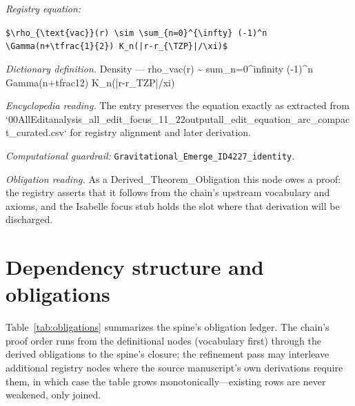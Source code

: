 \documentclass[11pt]{article}
\theoremstyle{remark}
\begin{document}
\noindent\textit{Registry equation:}\par
{\small\texttt{\$\textbackslash{}rho\_\{\textbackslash{}text\{vac\}\}(r) \textbackslash{}sim \textbackslash{}sum\_\{n=0\}\textasciicircum{}\{\textbackslash{}infty\} (-1)\textasciicircum{}n \textbackslash{}Gamma(n+\textbackslash{}tfrac\{1\}\{2\}) K\_n(|r-r\_\{\textbackslash{}TZP\}|/\textbackslash{}xi)\$}}\par\medskip
\noindent\textit{Dictionary definition.} Density --- rho\_vac(r) \textasciitilde{} sum\_n=0\textasciicircum{}infinity (-1)\textasciicircum{}n Gamma(n+tfrac12) K\_n(|r-r\_TZP|/xi)\par\medskip
\noindent\textit{Encyclopedia reading.} The entry preserves the equation exactly as extracted from `00AllEditanalysis\_all\_edit\_focus\_11\_22outputall\_edit\_equation\_arc\_compact\_curated.csv` for registry alignment and later derivation.
\par\medskip\noindent\textit{Computational guardrail:} \texttt{Gravitational\_Emerge\_ID4227\_identity}.
\par\medskip\noindent\textit{Obligation reading.} As a Derived\_Theorem\_Obligation this node owes a proof: the registry asserts that it follows from the chain's upstream vocabulary and axioms, and the Isabelle focus stub holds the slot where that derivation will be discharged.

\section{Dependency structure and obligations}
\label{sec:dep}

Table~\ref{tab:obligations} summarizes the spine's obligation ledger. The chain's proof order runs from the definitional nodes (vocabulary first) through the derived obligations to the spine's closure; the refinement pass may interleave additional registry nodes where the source manuscript's own derivations require them, in which case the table grows monotonically---existing rows are never weakened, only joined.
\end{document}
